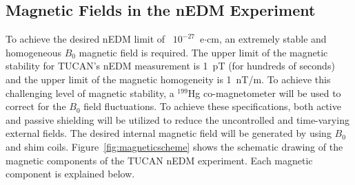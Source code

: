 




\subsection{Magnetic Fields in the nEDM Experiment}
To achieve the desired nEDM limit of ~$10^{-27}$~e$\cdot$cm, an
extremely stable and homogeneous $B_0$ magnetic field is required.
The upper limit of the magnetic stability for TUCAN's nEDM measurement
is 1~pT (for hundreds of seconds) and the upper limit of the magnetic
homogeneity is 1~nT/m.
To achieve this challenging level of magnetic stability, a $^{199}$Hg
co-magnetometer will be used to correct for the $B_0$ field
fluctuations. To achieve these specifications, both active and passive
shielding will be utilized to reduce the uncontrolled and time-varying
external fields. The desired internal magnetic field will be generated
by using $B_0$ and shim coils. Figure~\ref{fig:magneticscheme} shows
the schematic drawing of the magnetic components of the TUCAN nEDM
experiment. Each magnetic component is explained below.

